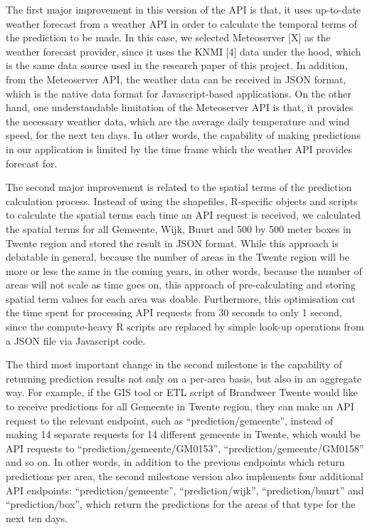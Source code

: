 \documentclass{utitcphd_overleaf}
\begin{document}
The first major improvement in this version of the API is that, it uses up-to-date weather forecast from a weather API in order to calculate the temporal terms of the prediction to be made. In this case, we selected Meteoserver [X] as the weather forecast provider, since it uses the KNMI [4] data under the hood, which is the same data source used in the research paper of this project. In addition, from the Meteoserver API, the weather data can be received in JSON format, which is the native data format for Javascript-based applications. On the other hand, one understandable limitation of the Meteoserver API is that, it provides the necessary weather data, which are the average daily temperature and wind speed, for the next ten days. In other words, the capability of making predictions in our application is limited by the time frame which the weather API provides forecast for.

The second major improvement is related to the spatial terms of the prediction calculation process. Instead of using the shapefiles, R-specific objects and scripts to calculate the spatial terms each time an API request is received, we calculated the spatial terms for all Gemeente, Wijk, Buurt and 500 by 500 meter boxes in Twente region and stored the result in JSON format. While this approach is debatable in general, because the number of areas in the Twente region will be more or less the same in the coming years, in other words, because the number of areas will not scale as time goes on, this approach of pre-calculating and storing spatial term values for each area was doable. Furthermore, this optimisation cut the time spent for processing API requests from 30 seconds to only 1 second, since the compute-heavy R scripts are replaced by simple look-up operations from a JSON file via Javascript code.

The third most important change in the second milestone is the capability of returning prediction results not only on a per-area basis, but also in an aggregate way. For example, if the GIS tool or ETL script of Brandweer Twente would like to receive predictions for all Gemeente in Twente region, they can make an API request to the relevant endpoint, such as “prediction/gemeente”, instead of making 14 separate requests for 14 different gemeente in Twente, which would be API requests to “prediction/gemeente/GM0153”, “prediction/gemeente/GM0158” and so on. In other words, in addition to the previous endpoints which return predictions per area, the second milestone version also implements four additional API endpoints: “prediction/gemeente”, “prediction/wijk”, “prediction/buurt” and “prediction/box”, which return the predictions for the areas of that type for the next ten days.
\end{document}
